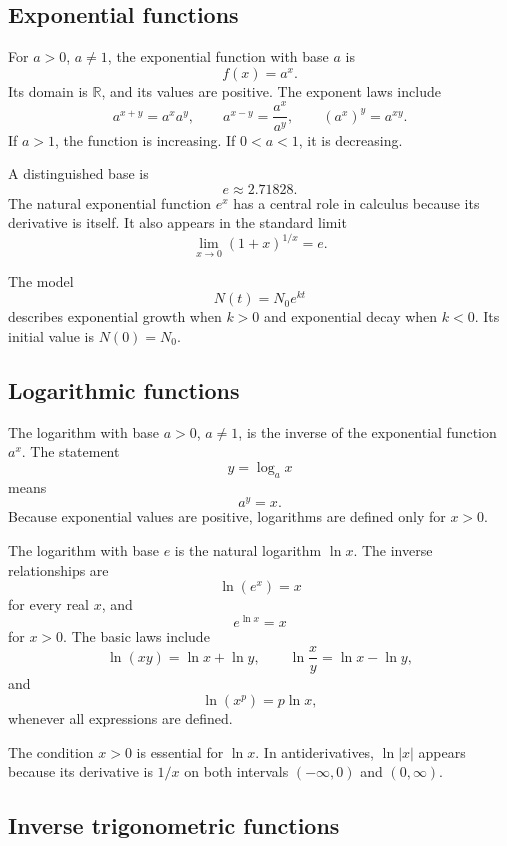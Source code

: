 \subsection*{Exponential functions}

For \(a>0\), \(a\ne1\), the exponential function with base \(a\) is
\[
f(x)=a^x.
\]
Its domain is \(\mathbb{R}\), and its values are positive. The exponent laws include
\[
a^{x+y}=a^xa^y,
\qquad
a^{x-y}=\frac{a^x}{a^y},
\qquad
(a^x)^y=a^{xy}.
\]
If \(a>1\), the function is increasing. If \(0<a<1\), it is decreasing.

A distinguished base is
\[
e\approx2.71828.
\]
The natural exponential function \(e^x\) has a central role in calculus because its derivative is itself. It also appears in the standard limit
\[
\lim_{x\to0}(1+x)^{1/x}=e.
\]

\begin{examplebox}
The model
\[
N(t)=N_0e^{kt}
\]
describes exponential growth when \(k>0\) and exponential decay when \(k<0\). Its initial value is \(N(0)=N_0\).
\end{examplebox}

\subsection*{Logarithmic functions}

The logarithm with base \(a>0\), \(a\ne1\), is the inverse of the exponential function \(a^x\). The statement
\[
y=\log_a x
\]
means
\[
a^y=x.
\]
Because exponential values are positive, logarithms are defined only for \(x>0\).

The logarithm with base \(e\) is the natural logarithm \(\ln x\). The inverse relationships are
\[
\ln(e^x)=x
\]
for every real \(x\), and
\[
e^{\ln x}=x
\]
for \(x>0\). The basic laws include
\[
\ln(xy)=\ln x+\ln y,
\qquad
\ln\frac{x}{y}=\ln x-\ln y,
\]
and
\[
\ln(x^p)=p\ln x,
\]
whenever all expressions are defined.

\begin{remarkbox}
The condition \(x>0\) is essential for \(\ln x\). In antiderivatives, \(\ln|x|\) appears because its derivative is \(1/x\) on both intervals \((-\infty,0)\) and \((0,\infty)\).
\end{remarkbox}

\subsection*{Inverse trigonometric functions}

